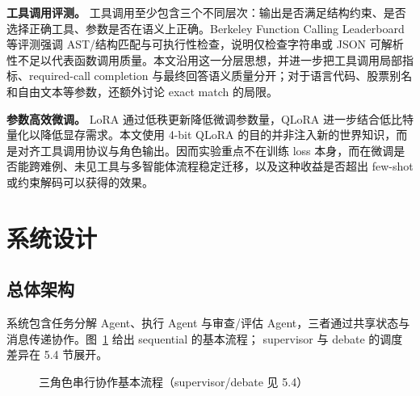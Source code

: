 \documentclass[UTF8,a4paper,12pt]{ctexart}
\begin{document}
\textbf{工具调用评测。} 工具调用至少包含三个不同层次：输出是否满足结构约束、是否选择正确工具、参数是否在语义上正确。Berkeley Function Calling Leaderboard 等评测强调 AST/结构匹配与可执行性检查\cite{bfcl}，说明仅检查字符串或 JSON 可解析性不足以代表函数调用质量。本文沿用这一分层思想，并进一步把工具调用局部指标、required-call completion 与最终回答语义质量分开；对于语言代码、股票别名和自由文本等参数，还额外讨论 exact match 的局限。

\textbf{参数高效微调。} LoRA 通过低秩更新降低微调参数量\cite{hu2022lora}，QLoRA 进一步结合低比特量化以降低显存需求\cite{dettmers2023qlora}。本文使用 4-bit QLoRA 的目的并非注入新的世界知识，而是对齐工具调用协议与角色输出。因而实验重点不在训练 loss 本身，而在微调是否能跨难例、未见工具与多智能体流程稳定迁移，以及这种收益是否超出 few-shot 或约束解码可以获得的效果。
\clearpage
\section{系统设计}\label{sec:system}
\subsection{总体架构}
系统包含任务分解 Agent、执行 Agent 与审查/评估 Agent，三者通过共享状态与
消息传递协作。图~\ref{fig:architecture} 给出 sequential 的基本流程；
supervisor 与 debate 的调度差异在 5.4 节展开。

\begin{figure}[H]
  \centering
  \caption{三角色串行协作基本流程（supervisor/debate 见 5.4）}
  \label{fig:architecture}
\end{figure}
\end{document}
